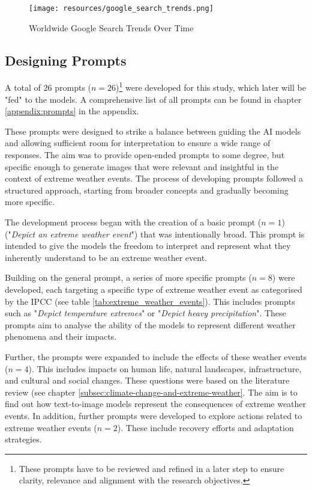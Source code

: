 \begin{figure}[h]
    \centering
    \texttt{[image: resources/google\_search\_trends.png]}
    \caption[Text-to-Image Models Google Search Trends]{Worldwide Google Search Trends Over Time}
    \label{fig:google_search_trends}
\end{figure}

\subsection{Designing Prompts}
\label{subsec:designing-prompts}

A total of $26$ prompts ($n=26$)\footnote{These prompts have to be reviewed and refined in a later step to ensure clarity, relevance and alignment with the research objectives. } were developed for this study, which later will be "fed" to the models. A comprehensive list of all prompts can be found in chapter \ref{appendix:prompts} in the appendix.

These prompts were designed to strike a balance between guiding the AI models and allowing sufficient room for interpretation to ensure a wide range of responses. The aim was to provide open-ended prompts to some degree, but specific enough to generate images that were relevant and insightful in the context of extreme weather events. The process of developing prompts followed a structured approach, starting from broader concepts and gradually becoming more specific.

The development process began with the creation of a basic prompt  ($n=1$) ("\textit{Depict an extreme weather event}") that was intentionally broad. This prompt is intended to give the models the freedom to interpret and represent what they inherently understand to be an extreme weather event.

Building on the general prompt, a series of more specific prompts ($n=8$) were developed, each targeting a specific type of extreme weather event as categorised by the IPCC (see table \ref{tab:extreme_weather_events}). This includes prompts such as "\textit{Depict temperature extremes}" or "\textit{Depict heavy precipitation}". These prompts aim to analyse the ability of the models to represent different weather phenomena and their impacts.

Further, the prompts were expanded to include the effects of these weather events ($n=4$). This includes impacts on human life, natural landscapes, infrastructure, and cultural and social changes. These questions were based on the literature review (see chapter \ref{subsec:climate-change-and-extreme-weather}. The aim is to find out how text-to-image models represent the consequences of extreme weather events. In addition, further prompts were developed to explore actions related to extreme weather events ($n=2$). These include recovery efforts and adaptation strategies.

